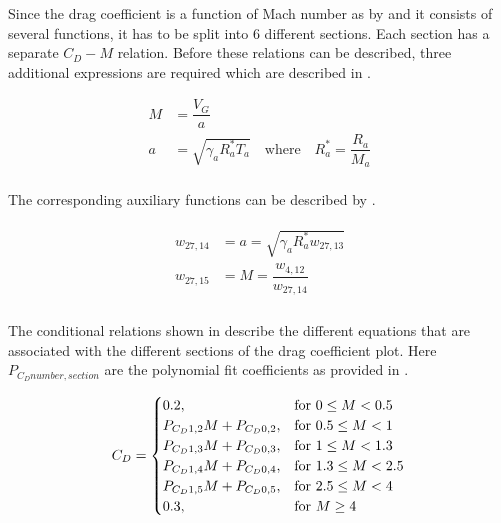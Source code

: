 \noindent
Since the drag coefficient is a function of Mach number as by  and it consists of several functions, it has to be split into 6 different sections. Each section has a separate $C_{D}-M$ relation. Before these relations can be described, three additional expressions are required which are described in .

 \begin{equation} \label{eq:cd}
\begin{split}
M &= \dfrac{V_{G}}{a} \\
a &= \sqrt{\gamma_{a}R_{a}^{*}T_{a}} \quad \text{where} \quad R_{a}^{*}=\dfrac{R_{a}}{M_{a}} \\
\end{split}
\end{equation}

\noindent
The corresponding auxiliary functions can be described by .

\begin{align} \label{eq:cdAuxF}
\begin{split}
w_{27,14} &= a = \sqrt{\gamma_{a}R_{a}^{*}w_{27,13}}  \\
w_{27,15} &= M = \dfrac{w_{4,12}}{w_{27,14}} \\
\end{split}
\end{align}

\noindent
The conditional relations shown in  describe the different equations that are associated with the different sections of the drag coefficient plot. Here $P_{C_{D} number,section}$ are the polynomial fit coefficients as provided in .

\begin{equation}\label{eq:cdCondC}
C_{D}=\begin{cases}
0.2, & \text{for } 0\leq M < 0.5\\
P_{C_{D} 1,2}M+P_{C_{D} 0,2}, &  \text{for } 0.5\leq M < 1 \\
P_{C_{D} 1,3}M+P_{C_{D} 0,3}, &  \text{for } 1\leq M < 1.3 \\
P_{C_{D} 1,4}M+P_{C_{D} 0,4}, &  \text{for } 1.3\leq M < 2.5 \\
P_{C_{D} 1,5}M+P_{C_{D} 0,5}, &  \text{for } 2.5\leq M < 4 \\
0.3, &  \text{for } M \geq 4 
\end{cases}\\
\end{equation}

